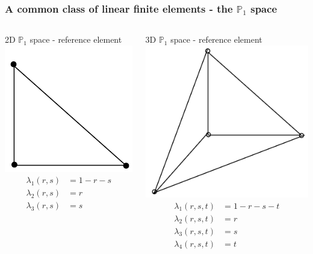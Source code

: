 \documentclass[compress,10pt]{beamer}
\begin{document}
\begin{frame}[t]\frametitle{A common class of linear finite elements - the $\mathbb{P}_1$ space}
\begin{columns}
 \vspace{-6mm}
\begin{block}{2D $\mathbb{P}_1$ space - reference element} 
\centering
{}\includegraphics[width=0.55\columnwidth]{images/ref_triangle.png} \vspace{3mm}
\begin{equation*}
\begin{aligned}
\lambda_1 (r,s) &= 1-r-s  \\ 
\lambda_2 (r,s) &= r \\ 
\lambda_3 (r,s) &= s 
\end{aligned}
\end{equation*}
\end{block}
\begin{block}{3D $\mathbb{P}_1$ space - reference element}
\centering
{}\includegraphics[width=0.60\columnwidth]{images/ref_tet.png} \vspace{3mm}
\begin{equation*}
\begin{aligned}
\lambda_1 (r,s,t) &= 1-r-s - t \\ 
\lambda_2 (r,s,t) &= r \\ 
\lambda_3 (r,s,t) &= s \\
\lambda_4 (r,s,t) &= t \\
\end{aligned}
\end{equation*}
\end{block}
\end{columns}
\end{frame}
\end{document}
